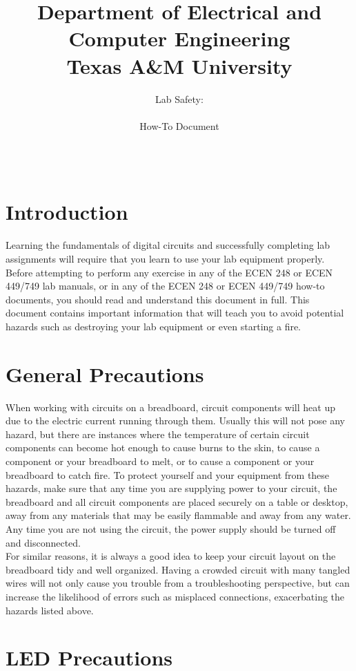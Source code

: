 \documentclass[11pt,twoside,titlepage]{article}
\title{ \huge Department of Electrical and Computer Engineering\\ \huge Texas A\&M University \\}
\author{ \huge Lab Safety:\\ \\ \huge How-To Document \\ \\ \\ \ta}
\date{}
\begin{document}

\maketitle

\section{Introduction}
Learning the fundamentals of digital circuits and successfully completing lab assignments will require that you learn to use your lab equipment properly. Before attempting to perform any exercise in any of the ECEN 248 or ECEN 449/749 lab manuals, or in any of the ECEN 248 or ECEN 449/749 how-to documents, you should read and understand this document in full. This document contains important information that will teach you to avoid potential hazards such as destroying your lab equipment or even starting a fire.\\

\section{General Precautions}

\noindent
When working with circuits on a breadboard, circuit components will heat up due to the electric current running through them. Usually this will not pose any hazard, but there are instances where the temperature of certain circuit components can become hot enough to cause burns to the skin, to cause a component or your breadboard to melt, or to cause a component or your breadboard to catch fire. To protect yourself and your equipment from these hazards, make sure that any time you are supplying power to your circuit, the breadboard and all circuit components are placed securely on a table or desktop, away from any materials that may be easily flammable and away from any water. Any time you are not using the circuit, the power supply should be turned off and disconnected.\\

\noindent
For similar reasons, it is always a good idea to keep your circuit layout on the breadboard tidy and well organized. Having a crowded circuit with many tangled wires will not only cause you trouble from a troubleshooting perspective, but can increase the likelihood of errors such as misplaced connections, exacerbating the hazards listed above.

\section{LED Precautions}
\end{document}
